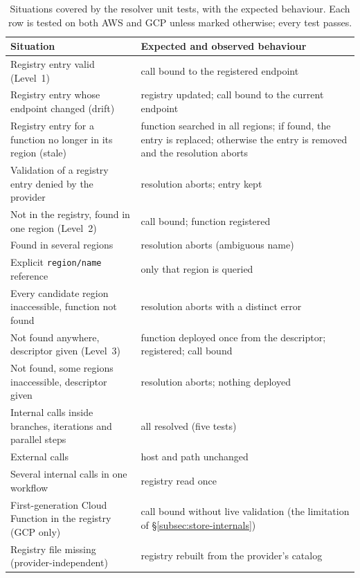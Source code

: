 \begin{table}[htbp]
  \centering
  \caption{Situations covered by the resolver unit tests, with the expected behaviour. Each row is
  tested on both AWS and GCP unless marked otherwise; every test passes.}
  \label{tab:eval-correctness}
  \begin{tabular}{p{}p{}}
    \hline
    \textbf{Situation} & \textbf{Expected and observed behaviour} \\
    \hline
    Registry entry valid (Level~1) & call bound to the registered endpoint \\
    Registry entry whose endpoint changed (drift) & registry updated; call bound to the current
    endpoint \\
    Registry entry for a function no longer in its region (stale) & function searched in all
    regions; if found, the entry is replaced; otherwise the entry is removed and the resolution
    aborts \\
    Validation of a registry entry denied by the provider & resolution aborts; entry kept \\
    Not in the registry, found in one region (Level~2) & call bound; function registered \\
    Found in several regions & resolution aborts (ambiguous name) \\
    Explicit \texttt{region/name} reference & only that region is queried \\
    Every candidate region inaccessible, function not found & resolution aborts with a distinct
    error \\
    Not found anywhere, descriptor given (Level~3) & function deployed once from the descriptor;
    registered; call bound \\
    Not found, some regions inaccessible, descriptor given & resolution aborts; nothing deployed \\
    Internal calls inside branches, iterations and parallel steps & all resolved (five tests) \\
    External calls & host and path unchanged \\
    Several internal calls in one workflow & registry read once \\
    First-generation Cloud Function in the registry (GCP only) & call bound without live
    validation (the limitation of \S\ref{subsec:store-internals}) \\
    Registry file missing (provider-independent) & registry rebuilt from the provider's catalog \\
    \hline
  \end{tabular}
\end{table}

